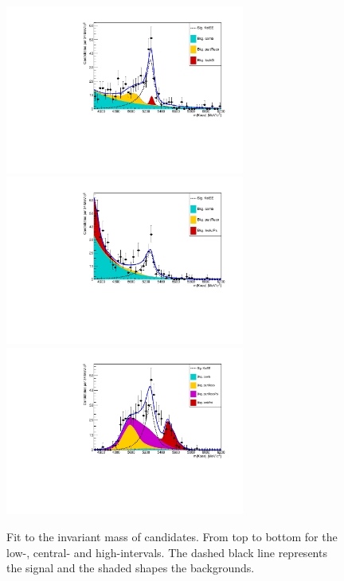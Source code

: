 \begin{figure}[h!]
\centering
\includegraphics[width=0.7\textwidth]{RKst/figs/Fit/fit_EE/fit_EEl.pdf}
\includegraphics[width=0.7\textwidth]{RKst/figs/Fit/fit_EE/fit_EEc.pdf}
\includegraphics[width=0.7\textwidth]{RKst/figs/Fit/fit_EE/fit_EEh.pdf}
\caption{Fit to the \mKpiee invariant mass of \BdToKstee candidates. From top to bottom for the low-, central-
and high-\qsq intervals. The dashed black line represents the signal and the shaded shapes the backgrounds.}
\label{fig:fitsEE}
\end{figure}
%
